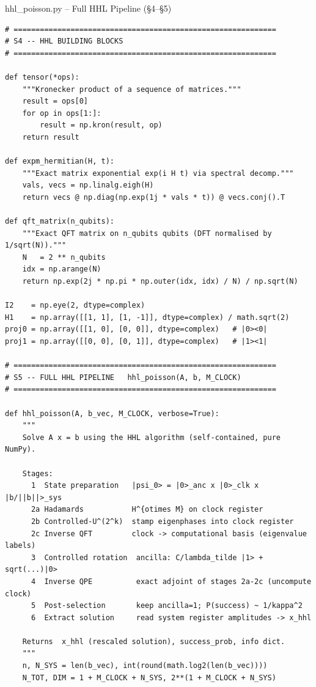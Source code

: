 \documentclass{beamer}
\begin{document}

\begin{frame}{hhl\_poisson.py -- Full HHL Pipeline (\S4--\S5)}
\begin{lstlisting}
# ============================================================
# S4 -- HHL BUILDING BLOCKS
# ============================================================

def tensor(*ops):
    """Kronecker product of a sequence of matrices."""
    result = ops[0]
    for op in ops[1:]:
        result = np.kron(result, op)
    return result

def expm_hermitian(H, t):
    """Exact matrix exponential exp(i H t) via spectral decomp."""
    vals, vecs = np.linalg.eigh(H)
    return vecs @ np.diag(np.exp(1j * vals * t)) @ vecs.conj().T

def qft_matrix(n_qubits):
    """Exact QFT matrix on n_qubits qubits (DFT normalised by 1/sqrt(N))."""
    N   = 2 ** n_qubits
    idx = np.arange(N)
    return np.exp(2j * np.pi * np.outer(idx, idx) / N) / np.sqrt(N)

I2    = np.eye(2, dtype=complex)
H1    = np.array([[1, 1], [1, -1]], dtype=complex) / math.sqrt(2)
proj0 = np.array([[1, 0], [0, 0]], dtype=complex)   # |0><0|
proj1 = np.array([[0, 0], [0, 1]], dtype=complex)   # |1><1|

# ============================================================
# S5 -- FULL HHL PIPELINE   hhl_poisson(A, b, M_CLOCK)
# ============================================================

def hhl_poisson(A, b_vec, M_CLOCK, verbose=True):
    """
    Solve A x = b using the HHL algorithm (self-contained, pure NumPy).

    Stages:
      1  State preparation   |psi_0> = |0>_anc x |0>_clk x |b/||b||>_sys
      2a Hadamards           H^{otimes M} on clock register
      2b Controlled-U^(2^k)  stamp eigenphases into clock register
      2c Inverse QFT         clock -> computational basis (eigenvalue labels)
      3  Controlled rotation  ancilla: C/lambda_tilde |1> + sqrt(...)|0>
      4  Inverse QPE          exact adjoint of stages 2a-2c (uncompute clock)
      5  Post-selection       keep ancilla=1; P(success) ~ 1/kappa^2
      6  Extract solution     read system register amplitudes -> x_hhl

    Returns  x_hhl (rescaled solution), success_prob, info dict.
    """
    n, N_SYS = len(b_vec), int(round(math.log2(len(b_vec))))
    N_TOT, DIM = 1 + M_CLOCK + N_SYS, 2**(1 + M_CLOCK + N_SYS)


\end{lstlisting}
\end{frame}
\end{document}
